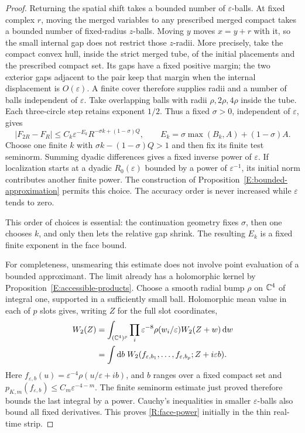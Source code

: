 \begin{proof}
Returning the spatial shift takes a bounded number of
$\varepsilon$-balls.  At fixed complex $r$, moving the merged
variables to any prescribed merged compact takes a bounded number
of fixed-radius $z$-balls.  Moving $y$ moves $x=y+r$ with it, so the
small internal gap does not restrict those $z$-radii.  More precisely,
take the compact convex hull, inside the strict merged tube, of the
initial placements and the prescribed compact set.  Its gaps have a fixed positive
margin; the two exterior gaps adjacent to the pair keep that margin
when the internal displacement is $O(\varepsilon)$.  A finite cover
therefore supplies radii and a number of balls independent of
$\varepsilon$.  Take overlapping
balls with radii $\rho,2\rho,4\rho$ inside the tube.  Each three-circle
step retains exponent $1/2$.  Thus a fixed $\sigma>0$, independent of
$\varepsilon$, gives
\begin{equation}\label{R:dyadic-face}
 |F_{2R}-F_R|
   \leq C_k\varepsilon^{-E_k}
             R^{-\sigma k+(1-\sigma)Q},
 \qquad E_k=\sigma\max(B_k,A)+(1-\sigma)A.
\end{equation}
Choose one finite $k$ with $\sigma k-(1-\sigma)Q>1$ and then fix its
finite test seminorm.  Summing dyadic differences gives a fixed
inverse power of $\varepsilon$.  If localization starts at a dyadic
$R_0(\varepsilon)$ bounded by a power of $\varepsilon^{-1}$, its
initial norm contributes another finite power.  The construction of
Proposition~\ref{E:bounded-approximation} permits this choice.  The
accuracy order is never increased while $\varepsilon$ tends to zero.

This order of choices is essential: the continuation geometry fixes
$\sigma$, then one chooses $k$, and only then lets the relative gap
shrink.  The resulting $E_k$ is a fixed finite exponent in the face
bound.

For completeness, unsmearing this estimate does not involve point
evaluation of a bounded approximant.  The limit already has a
holomorphic kernel by Proposition~\ref{E:accessible-products}.  Choose
a smooth radial bump $\rho$ on $\mathbb C^4$ of integral one, supported in
a sufficiently small ball.  Holomorphic mean value in each of $p$
slots gives, writing $Z$ for the full slot coordinates,
\begin{align}\label{R:unsmear}
 W_2(Z)
 &=\int_{(\mathbb C^4)^p}\prod_i\varepsilon^{-8}
               \rho(w_i/\varepsilon)W_2(Z+w)\,\mathrm d w\\
 &=\int \mathrm d b\;
     W_2(f_{\varepsilon,b_1},\ldots,f_{\varepsilon,b_p};
                     Z+i\varepsilon b).\notag
\end{align}
Here $f_{\varepsilon,b}(u)=\varepsilon^{-4}\rho(u/\varepsilon+ib)$,
and $b$ ranges over a fixed compact set and
$p_{K,m}(f_{\varepsilon,b})\leq C_m\varepsilon^{-4-m}$.
The finite seminorm estimate just proved therefore bounds the last
integral by a power.  Cauchy's inequalities in smaller
$\varepsilon$-balls also bound all fixed derivatives.  This proves
\eqref{R:face-power} initially in the thin real-time strip.


\end{proof}
